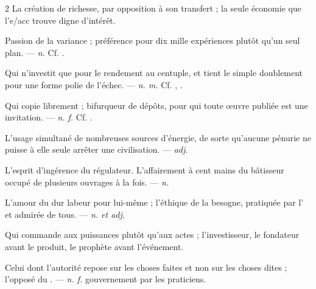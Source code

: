 \begin{multicols}{2}
 La création de richesse, par opposition à son transfert ; la seule économie que l'e/acc trouve digne d'intérêt.

 Passion de la variance ; préférence pour dix mille expériences plutôt qu'un seul plan. —  \textit{n.} Cf. .

 Qui n'investit que pour le rendement au centuple, et tient le simple doublement pour une forme polie de l'échec.  —  \textit{n. m.} Cf. , .

 Qui copie librement ; bifurqueur de dépôts, pour qui toute œuvre publiée est une invitation. —  \textit{n. f.} Cf. .

 L'usage simultané de nombreuses sources d'énergie, de sorte qu'aucune pénurie ne puisse à elle seule arrêter une civilisation.  —  \textit{adj.}

   L'esprit d'ingérence du régulateur.   L'affairement à cent mains du bâtisseur occupé de plusieurs ouvrages à la fois. —  \textit{n.}

 L'amour du dur labeur pour lui-même ; l'éthique de la besogne, pratiquée par l' et admirée de tous. —  \textit{n. et adj.}

 Qui commande aux puissances plutôt qu'aux actes ; l'investisseur, le fondateur avant le produit, le prophète avant l'événement.

 Celui dont l'autorité repose sur les choses faites et non sur les choses dites ; l'opposé du . —  \textit{n. f.} gouvernement par les praticiens.


\end{multicols}
